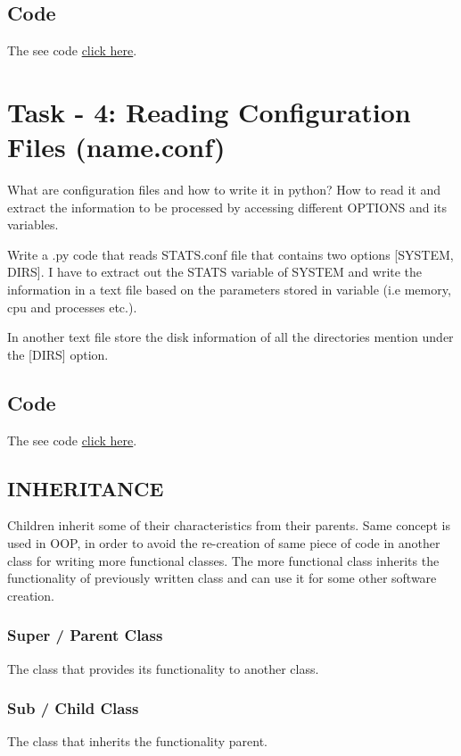 \documentclass[letterpaper,10pt,english]{sphinxmanual}
\begin{document}
\subsection{Code}
\label{week-08:id2}
The see code \href{https://github.com/LinuxIoT/training/tree/DEV/GET\_FS\_Dictionary\_Task\_classified}{click here}.


\section{Task - 4: Reading Configuration Files (name.conf)}
\label{week-08:task-4-reading-configuration-files-name-conf}
What are configuration files and how to write it in python? How to read it and extract the information to be processed by accessing different OPTIONS and its variables.

Write a .py code that reads STATS.conf file that contains two options {[}SYSTEM, DIRS{]}. I have to extract out the STATS variable of SYSTEM and write the information in a text file based on the parameters stored in variable (i.e memory, cpu and processes etc.).

In another text file store the disk information of all the directories mention under the {[}DIRS{]} option.


\subsection{Code}
\label{week-08:id4}
The see code \href{https://github.com/LinuxIoT/training/tree/DEV/Reading\%20Conf\%20Files\%20\%28TASK\%20-\%202\%29}{click here}.


\subsection{INHERITANCE}
\label{week-08:inheritance}
Children inherit some of their characteristics from their parents. Same concept is used in OOP, in order to avoid the re-creation of same piece of code in another class for writing more functional classes. The more functional class inherits the functionality of previously written class and can use it for some other software creation.


\subsubsection{Super / Parent Class}
\label{week-08:super-parent-class}
The class that provides its functionality to another class.


\subsubsection{Sub / Child Class}
\label{week-08:sub-child-class}
The class that inherits the functionality parent.
\end{document}
